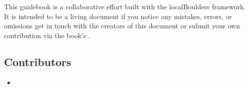 \begin{multicols}{2}
This guidebook is a collaborative effort built with the localBoulders framework. It is intended to be a living document if you notice any mistakes, errors, or omissions get in touch with the creators of this document or submit your own contribution via the book's .
\subsection*{Contributors}
\begin{itemize}
\item {}
\end{itemize}
\end{multicols}
\clearpage